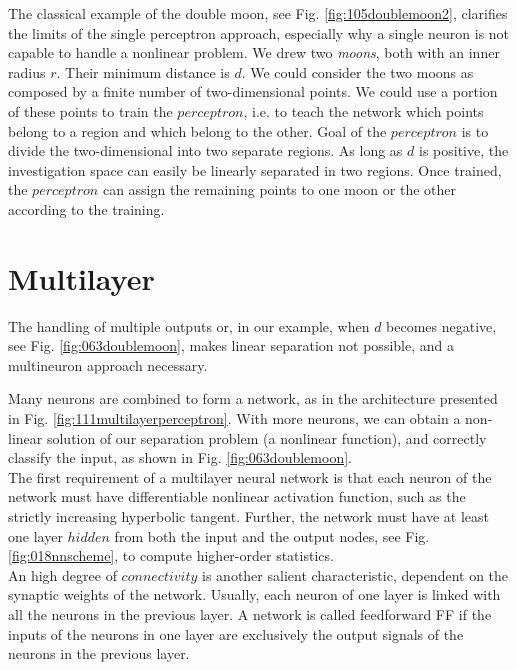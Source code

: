 The classical example of the double moon, see Fig. \ref{fig:105doublemoon2},
clarifies the limits of the single perceptron approach, especially 
why a single neuron is not capable to handle a
nonlinear problem.
We drew two \textit{moons}, both with an inner radius $r$. 
Their minimum distance is $d$.
We could consider the two moons as composed by a finite number of
two-dimensional points.
We could use a portion of these points to train the $perceptron$, i.e. 
to teach the network which points belong to a region and which belong to the
other.
Goal of the $perceptron$ is to divide the two-dimensional
into two separate regions.
As long as $d$ is positive, the investigation space
can easily be linearly separated in two regions.
Once trained, the $perceptron$ can assign the remaining points 
to one moon or the other according to the training.

\section{Multilayer}
\label{sec:multilayer}



The handling of multiple outputs or, in our example, 
when $d$ becomes negative, see Fig. \ref{fig:063doublemoon}, makes linear
separation not possible, and a multineuron approach necessary. 

Many neurons are combined to form a network, as in the architecture presented
in Fig. \ref{fig:111multilayerperceptron}.
With more neurons, we can obtain a non-linear solution of our separation
problem (a nonlinear function), and correctly classify the input, as shown in
Fig.
\ref{fig:063doublemoon}.\\
The first requirement of a multilayer neural network is that each neuron 
of the network must have differentiable nonlinear activation
function, such as the strictly increasing hyperbolic tangent.
Further, the network must have at least one layer $hidden$ from both the input
and the output nodes, see Fig. \ref{fig:018nnscheme}, to compute higher-order
statistics.\\
An high degree of $connectivity$ is another salient characteristic, dependent on
the synaptic weights of the network.
Usually, each neuron of one layer is linked with all the neurons in the previous
layer.
A network is called feedforward \acs{FF} if the inputs of the neurons in
one layer are exclusively the output signals of the neurons in the previous
layer.\\

